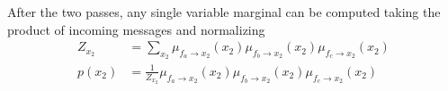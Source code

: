 \documentclass[slidestop,compress,mathserif]{beamer}
\begin{document}
\begin{frame}
\begin{center}
\end{center}
After the two passes, any single variable marginal can be computed taking the product of incoming messages and normalizing
    \begin{align*}
	Z_{x_2} & = \sum_{x_2} \mu_{f_a\rightarrow x_2}(x_2)\mu_{f_b\rightarrow x_2}(x_2)\mu_{f_c\rightarrow x_2}(x_2) \\
	p(x_2) & = \frac{1}{Z_{x_2}}\mu_{f_a\rightarrow x_2}(x_2)\mu_{f_b\rightarrow x_2}(x_2)\mu_{f_c\rightarrow x_2}(x_2)
    \end{align*}
\end{frame}
\end{document}
